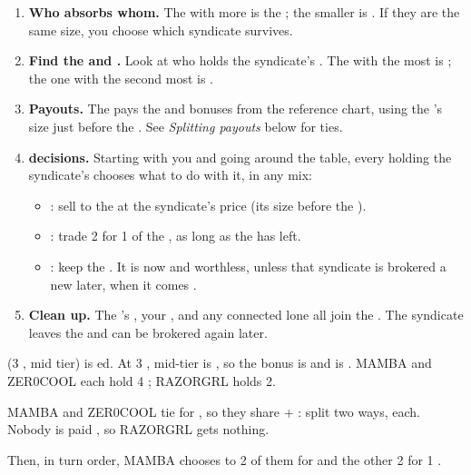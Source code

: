 \begin{enumerate}[label=\textbf{\arabic*.},leftmargin=1.6em]
  \item \textbf{Who absorbs whom.} The  with more  is the ; the smaller is .
    If they are the same size, you choose which syndicate survives.
  \item \textbf{Find the  and .} Look at who holds the  syndicate's . The  with the most is
    ; the one with the second most is .
  \item \textbf{Payouts.} The  pays the  and  bonuses from the reference chart, using the  's
    size just before the . See \emph{Splitting payouts} below for ties.
  \item \textbf{ decisions.} Starting with you and going around the table, every  holding the 
    syndicate's  chooses what to do with it, in any mix:
    \begin{itemize}
      \item {}: sell  to the  at the  syndicate's price (its size before the ).
      \item {}: trade 2   for 1  of the , as long as the  has   left.
      \item {}: keep the . It is now  and worthless, unless that syndicate is brokered a new
         later, when it comes .
    \end{itemize}
  \item \textbf{Clean up.} The  's , your , and any connected lone  all join the .
    The  syndicate leaves the  and can be brokered again later.
\end{enumerate}


\begin{example}
 (3 , mid tier) is ed. At 3 , mid-tier  is , so the  bonus is
 and  is . MAMBA and ZER0COOL each hold 4  ; RAZORGRL holds 2.

MAMBA and ZER0COOL tie for , so they share  + :  split two ways,  each.
Nobody is paid , so RAZORGRL gets nothing.

Then, in turn order, MAMBA chooses to  2 of them for  and  the other 2 for
1  .
\end{example}

